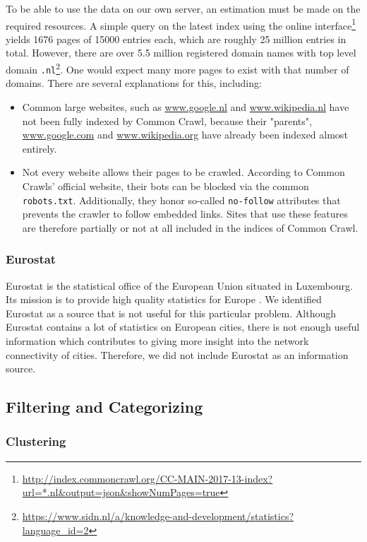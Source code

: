 To be able to use the data on our own server, an estimation must be made on the required resources. A simple query on the latest index using the online interface\footnote{\url{http://index.commoncrawl.org/CC-MAIN-2017-13-index?url=*.nl&output=json&showNumPages=true}} yields 1676 pages of 15000 entries each, which are roughly 25 million entries in total. However, there are over 5.5 million registered domain names with top level domain \texttt{.nl}\footnote{\url{https://www.sidn.nl/a/knowledge-and-development/statistics?language_id=2}}. One would expect many more pages to exist with that number of domains. There are several explanations for this, including:
\begin{itemize}
\item Common large websites, such as \url{www.google.nl} and \url{www.wikipedia.nl} have not been fully indexed by Common Crawl, because their "parents", \url{www.google.com} and \url{www.wikipedia.org} have already been indexed almost entirely.
\item Not every website allows their pages to be crawled. According to Common Crawls' official website, their bots can be blocked via the common \texttt{robots.txt}. Additionally, they honor so-called \texttt{no-follow} attributes that prevents the crawler to follow embedded links. Sites that use these features are therefore partially or not at all included in the indices of Common Crawl.
\end{itemize}

\subsubsection{Eurostat}
Eurostat is the statistical office of the European Union situated in Luxembourg. Its mission is to provide high quality statistics for Europe \cite{Eurostat}. We identified Eurostat as a source that is not useful for this particular problem. Although Eurostat contains a lot of statistics on European cities, there is not enough useful information which contributes to giving more insight into the network connectivity of cities. Therefore, we did not include Eurostat as an information source.

\subsection{Filtering and Categorizing}

\subsubsection{Clustering}
